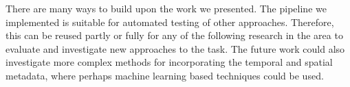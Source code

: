 There are many ways to build upon the work we presented. The pipeline we implemented is suitable for automated testing of other approaches. Therefore, this can be reused partly or fully for any of the following research in the area to evaluate and investigate new approaches to the \reid{} task. The future work could also investigate more complex methods for incorporating the temporal and spatial metadata, where perhaps machine learning based techniques could be used. 


